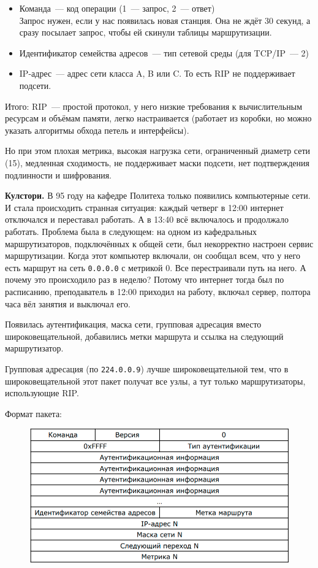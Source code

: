 \begin{itemize}
    \item Команда~--- код операции (1~--- запрос, 2~--- ответ)\\
    Запрос нужен, если у нас появилась новая станция. Она не ждёт 30 секунд, а сразу посылает запрос, чтобы ей скинули таблицы маршрутизации.
    \item Идентификатор семейства адресов~--- тип сетевой среды (для TCP/IP~--- 2)
    \item IP-адрес~--- адрес сети класса A, B или C. То есть RIP не поддерживает подсети.
\end{itemize}

Итого: RIP~--- простой протокол, у него низкие требования к вычислительным ресурсам и объёмам памяти, легко настраивается (работает из коробки, но можно указать алгоритмы обхода петель и интерфейсы).

Но при этом плохая метрика, высокая нагрузка сети, ограниченный диаметр сети (15), медленная сходимость, не поддерживает маски подсети, нет подтверждения подлинности и шифрования.

{\bf Кулстори.} В 95 году на кафедре Политеха только появились компьютерные сети. И стала происходить странная ситуация: каждый четверг в 12:00 интернет отключался и переставал работать. А в 13:40 всё включалось и продолжало работать. Проблема была в следующем: на одном из кафедральных маршрутизаторов, подключённых к общей сети, был некорректно настроен сервис маршрутизации. Когда этот компьютер включали, он сообщал всем, что у него есть маршрут на сеть {\tt 0.0.0.0} с метрикой 0. Все перестраивали путь на него. А почему это происходило раз в неделю? Потому что интернет тогда был по расписанию, преподаватель в 12:00 приходил на работу, включал сервер, полтора часа вёл занятия и выключал его.


Появилась аутентификация, маска сети, групповая адресация вместо широковещательной, добавились метки маршрута и ссылка на следующий маршрутизатор.

Групповая адресация (по {\tt 224.0.0.9}) лучше широковещательной тем, что в широковещательной этот пакет получат все узлы, а тут только маршрутизаторы, использующие RIP.

Формат пакета:

\begin{figure}[H]
  \centering
  \includegraphics[width=15cm]{images/04/08}
\end{figure}

